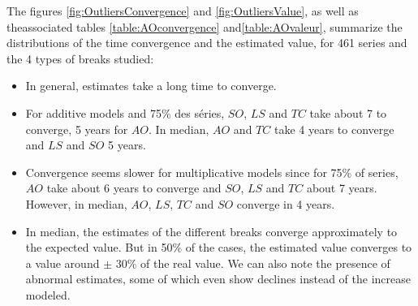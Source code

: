 \documentclass[12pt, a4paper]{article}
\begin{document}
The figures \ref{fig:OutliersConvergence} and \ref{fig:OutliersValue}, as well as theassociated tables \ref{table:AOconvergence} and\ref{table:AOvaleur}, summarize the distributions of the time convergence and the estimated value, for 461 series and the 4 types of breaks studied:
\begin{itemize}
	\item In general, estimates take a long time to converge.
		\item For additive models and 75\% des séries, $SO$, $LS$ and $TC$ take about 7 to converge, 5 years for $AO$. In median, $AO$ and $TC$ take 4 years to converge and $LS$ and $SO$ 5 years.
	\item Convergence seems  slower for multiplicative models since for 75\% of series, $AO$ take about 6 years to converge and $SO$, $LS$ and $TC$ about 7 years. However, in median, $AO$, $LS$, $TC$ and $SO$ converge in 4 years.
	\item In median, the estimates of the different breaks converge approximately to the expected value. But in 50\% of the cases, the estimated value converges to a value around $\pm$ 30\% of the real value. We can also note the presence of abnormal estimates, some of which even show declines instead of the increase modeled.
\end{itemize}
\end{document}
